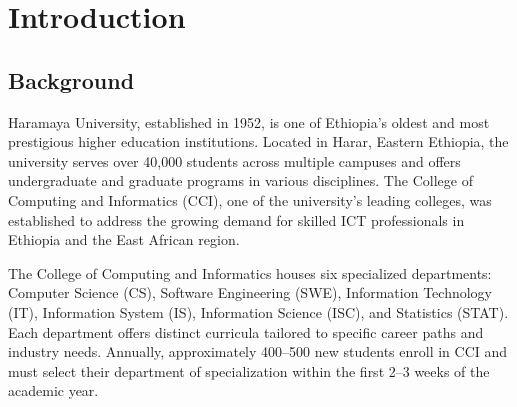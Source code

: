\documentclass[12pt, a4paper]{article}
\begin{document}
\section{Introduction}

\subsection{Background}

Haramaya University, established in 1952, is one of Ethiopia's oldest and most prestigious higher education institutions. Located in Harar, Eastern Ethiopia, the university serves over 40,000 students across multiple campuses and offers undergraduate and graduate programs in various disciplines. The College of Computing and Informatics (CCI), one of the university's leading colleges, was established to address the growing demand for skilled ICT professionals in Ethiopia and the East African region.

The College of Computing and Informatics houses six specialized departments: Computer Science (CS), Software Engineering (SWE), Information Technology (IT), Information System (IS), Information Science (ISC), and Statistics (STAT). Each department offers distinct curricula tailored to specific career paths and industry needs. Annually, approximately 400--500 new students enroll in CCI and must select their department of specialization within the first 2--3 weeks of the academic year.
\end{document}

